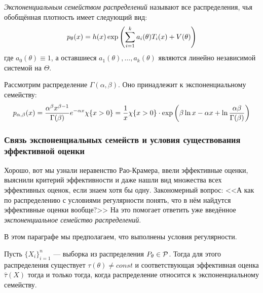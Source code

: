 \begin{definition}
	\textit{Экспоненциальным семейством распределений} называют все распределения, чья обобщённая плотность имеет следующий вид:
	\[
		p_\theta(x) = h(x)\exp\left(\sum_{i = 1}^k a_i(\theta)T_i(x) + V(\theta)\right)
	\]
	где $a_0(\theta) \equiv 1$, а оставшиеся $a_1(\theta), \ldots, a_k(\theta)$ являются линейно независимой системой на $\Theta$.
\end{definition}

\begin{example}
	Рассмотрим распределение $\Gamma(\alpha, \beta)$. Оно принадлежит к экспоненциальному семейству:
	\[
		p_{\alpha, \beta}(x) = \frac{\alpha^\beta x^{\beta - 1}}{\Gamma(\beta)} e^{-\alpha x} \chi\{x > 0\} = \frac{1}{x}\chi\{x > 0\} \cdot \exp\left(\beta \ln x - \alpha x + \ln \frac{\alpha \beta}{\Gamma(\beta)}\right)
	\]
\end{example}

\subsubsection*{Связь экспоненциальных семейств и условия существования эффективной оценки}

\begin{note}
	Хорошо, вот мы узнали неравенство Рао-Крамера, ввели эффективные оценки, выяснили критерий эффективности и даже нашли вид множества всех эффективных оценок, если знаем хотя бы одну. Закономерный вопрос: <<А как по распределению с условиями регулярности понять, что в нём найдутся эффективные оценки вообще?>> На это помогает ответить уже введённое \textit{экспоненциальное семейство распределений}.
\end{note}

\begin{note}
	В этом параграфе мы предполагаем, что выполнены условия регулярности.
\end{note}

\begin{theorem}
	Пусть $\{X_i\}_{i = 1}^n$ --- выборка из распределения $P_\theta \in \mathcal{P}$. Тогда для этого распределения существует $\tau(\theta) \neq const$ и соответствующая эффективная оценка $\hat{\tau}(X)$ тогда и только тогда, когда распределение относится к экспоненциальному семейству.
\end{theorem}

